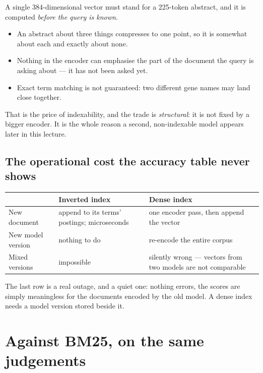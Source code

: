 \documentclass[11pt,a4paper]{article}
\begin{document}
A single 384-dimensional vector must stand for a 225-token abstract, and it is
computed \emph{before the query is known}.

\begin{itemize}[leftmargin=*,nosep]
  \item An abstract about three things compresses to one point, so it is
        somewhat about each and exactly about none.
  \item Nothing in the encoder can emphasise the part of the document the query
        is asking about --- it has not been asked yet.
  \item Exact term matching is not guaranteed: two different gene names may
        land close together.
\end{itemize}

That is the price of indexability, and the trade is \emph{structural}: it is
not fixed by a bigger encoder. It is the whole reason a second, non-indexable
model appears later in this lecture.

\subsection{The operational cost the accuracy table never shows}

\begin{center}
\small
\begin{tabular}{p{}p{}p{}}
\toprule
 & \textbf{Inverted index} & \textbf{Dense index} \\
\midrule
New document & append to its terms' postings; microseconds & one encoder pass,
then append the vector \\
New model version & nothing to do & re-encode the entire corpus \\
Mixed versions & impossible & silently wrong --- vectors from two models are
not comparable \\
\bottomrule
\end{tabular}
\end{center}

The last row is a real outage, and a quiet one: nothing errors, the scores are
simply meaningless for the documents encoded by the old model. A dense index
needs a model version stored beside it.

\section{Against BM25, on the same judgements}
\end{document}
